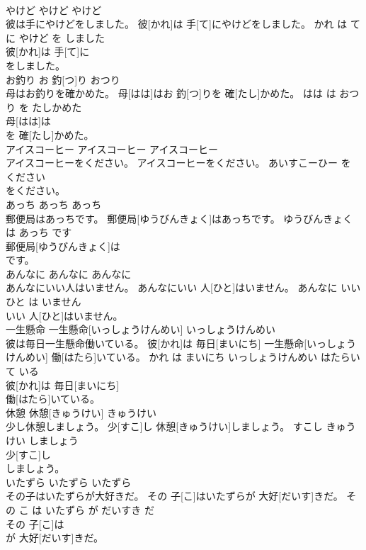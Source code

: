 \documentclass[8pt]{extreport}
\begin{document}
\begin{CJK}{UTF8}{min}
\\	やけど	やけど	やけど	
\\	彼は手にやけどをしました。	彼[かれ]は 手[て]にやけどをしました。	かれ は て に やけど を しました	
\\	彼[かれ]は 手[て]に
\\	をしました。			
\\	お釣り	お 釣[つ]り	おつり	
\\	母はお釣りを確かめた。	母[はは]はお 釣[つ]りを 確[たし]かめた。	はは は おつり を たしかめた	
\\	母[はは]は
\\	を 確[たし]かめた。			
\\	アイスコーヒー	アイスコーヒー	アイスコーヒー	
\\	アイスコーヒーをください。	アイスコーヒーをください。	あいすこーひー を ください	
\\	をください。			
\\	あっち	あっち	あっち	
\\	郵便局はあっちです。	郵便局[ゆうびんきょく]はあっちです。	ゆうびんきょく は あっち です	
\\	郵便局[ゆうびんきょく]は
\\	です。			
\\	あんなに	あんなに	あんなに	
\\	あんなにいい人はいません。	あんなにいい 人[ひと]はいません。	あんなに いい ひと は いません	
\\	いい 人[ひと]はいません。			
\\	一生懸命	一生懸命[いっしょうけんめい]	いっしょうけんめい	
\\	彼は毎日一生懸命働いている。	彼[かれ]は 毎日[まいにち] 一生懸命[いっしょうけんめい] 働[はたら]いている。	かれ は まいにち いっしょうけんめい はたらいて いる	
\\	彼[かれ]は 毎日[まいにち]
\\	働[はたら]いている。			
\\	休憩	休憩[きゅうけい]	きゅうけい	
\\	少し休憩しましょう。	少[すこ]し 休憩[きゅうけい]しましょう。	すこし きゅうけい しましょう	
\\	少[すこ]し
\\	しましょう。			
\\	いたずら	いたずら	いたずら	
\\	その子はいたずらが大好きだ。	その 子[こ]はいたずらが 大好[だいす]きだ。	その こ は いたずら が だいすき だ	
\\	その 子[こ]は
\\	が 大好[だいす]きだ。			

\end{CJK}
\end{document}

